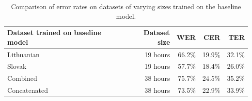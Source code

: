 \documentclass{article}
\begin{document}
  \begin{table}
    \begin{center}
      \begin{tabular}{lrrrr}
        \toprule
        Dataset trained on baseline model & Dataset size & WER    & CER    & TER \\\midrule
        Lithuanian                        & 19 hours     & 66.2\% & 19.9\% & 32.1\% \\
        Slovak                            & 19 hours     & 57.7\% & 18.4\% & 26.0\% \\
        Combined                          & 38 hours     & 75.7\% & 24.5\% & 35.2\% \\
        Concatenated                      & 38 hours     & 73.5\% & 22.9\% & 33.9\% \\\bottomrule
      \end{tabular}
    \end{center}
    \caption{Comparison of error rates on datasets of varying sizes trained on the baseline model.}
    \label{table-baseline-results}
  \end{table}
\end{document}
